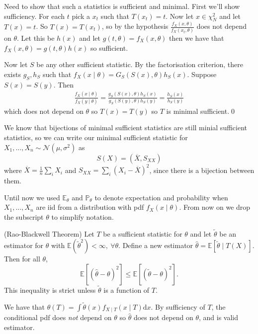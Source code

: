 \documentclass{article}
\begin{document}
\par
\pf Need to show that such a statistics is sufficient and minimal. First we'll show sufficiency. For each $ t $ pick a $ x_t $ such that $ T(x_t) = t $. Now let $ x\in \chi_N^2 $ and let $ T(x)=t $. So $ T(x) = T(x_t) $, so by the hypothesis $ \frac{f_X(x,\theta)}{f_X(x_t,\theta)} $ does not depend on $ \theta $. Let this be $ h(x) $ and let $ g(t,\theta) = f_X(x,\theta) $ then we have that $ f_X(x,\theta)=g(t,\theta)h(x) $ so sufficient.\par
Now let $ S $ be any other sufficient statistic. By the factorisation criterion, there exists $ g_S, h_S $ such that $ f_X(x\mid\theta)=G_S(S(x),\theta)h_S(x) $. Suppose $ S(x)=S(y) $. Then
\begin{align*}
	\frac{f_X(x\mid \theta)}{f_X(y\mid\theta)} = \frac{g_S(S(x),\theta)h_S(x)}{g_S(S(y),\theta)h_S(y)} = \frac{h_S(x)}{h_S(y)}
\end{align*}
which does not depend on $ \theta $ so $ T(x)=T(y) $ so $ T $ is minimal sufficient.\qed
\par
We know that bijections of minimal sufficient statistics are still minial sufficient statistics, so we can write our minimal sufficient statistic for $ X_1,\dots, X_n\sim\mathcal N(\mu,\sigma^2) $ as
\[
	S(X)=(\overline X,S_{XX})
\]
where $ \overline X = \frac 1n \sum_i X_i $ and $ S_{XX} = \sum_i(X_i-\overline X)^2 $, since there is a bijection between them.\par
Until now we used $ \mathbb E_\theta $ and $ \mathbb P_\theta $ to denote expectation and probability when $ X_1,\dots, X_n $ are iid from a distribution with pdf $ f_X(x\mid \theta) $. From now on we drop the subscript $ \theta $ to simplify notation.
\begin{theorem}
	(Rao-Blackwell Theorem) Let $ T $ be a sufficient statistic for $ \theta $ and let $ \tilde\theta $ be an estimator for $ \theta $ with $ \mathbb E(\tilde\theta^2)<\infty,\ \forall\theta $. Define a new estimator $ \hat\theta = \mathbb E[\tilde\theta\mid T(X)] $. Then for all $\theta $,
	\[
		\mathbb E[(\hat\theta-\theta)^2] \le \mathbb E[(\tilde\theta-\theta)^2].
	\]
	This inequality is strict unless $ \tilde\theta $ is a function of $ T $.
\end{theorem}
\begin{remark}
	We have that $ \hat\theta(T)=\int \tilde\theta(x)f_{X\mid T}(x\mid T)\mathrm dx $. By sufficiency of $ T $, the conditional pdf does \textit{not} depend on $ \theta $ so $ \hat \theta $ does not depend on $ \theta $, and is valid estimator.
\end{remark}
\end{document}
